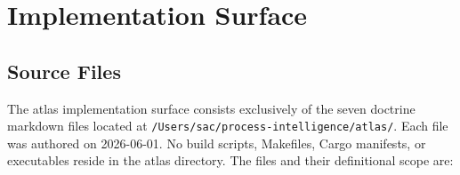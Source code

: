 
\section{Implementation Surface}
\label{sec:atlas-impl}

\subsection{Source Files}
\label{sec:atlas-impl-source}

The atlas implementation surface consists exclusively of the seven doctrine
markdown files located at \texttt{/Users/sac/process-intelligence/atlas/}. Each
file was authored on 2026-06-01. No build scripts, Makefiles, Cargo manifests,
or executables reside in the atlas directory. The files and their definitional
scope are:

